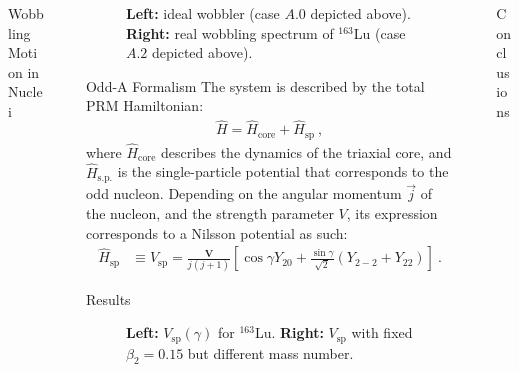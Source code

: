 \documentclass[final]{beamer}
\newlength{\sepwidth}
\newlength{\colwidth}
\newcommand{\separatorcolumn}{\begin{column}{\sepwidth}\end{column}}
\begin{document}
\begin{frame}[t]
\begin{columns}[t]
\begin{column}{\colwidth}
\begin{block}{Wobbling Motion in Nuclei}
\end{block}
\end{column}
\separatorcolumn
\begin{column}{\colwidth}
 \begin{figure}
\centering
\begin{minipage}{.5\textwidth}
  \centering
\end{minipage}%
\begin{minipage}{.5\textwidth}
  \centering
\end{minipage}
\caption{\textbf{Left:} ideal wobbler (case $A.0$ depicted above). \textbf{Right:} real wobbling spectrum of $^{163}$Lu (case $A.2$ depicted above).}
    \label{energy-function-min-point-evolution}
\end{figure}
  \begin{block}{Odd-A Formalism}
The system is described by the total PRM Hamiltonian:
\begin{align}
    \hat{H}=\hat{H}_\text{core}+\hat{H}_\text{sp}\ ,
\end{align}
where $\hat{H}_\text{core}$ describes the dynamics of the triaxial core, and $\hat{H}_\text{s.p.}$ is the single-particle potential that corresponds to the odd nucleon. Depending on the angular momentum $\vec{j}$ of the nucleon, and the strength parameter $V$, its expression corresponds to a Nilsson potential as such:
\begin{align}
\hat{H}_\text{sp}&\equiv V_\text{sp}=\frac{\mathbf{V}}{j(j+1)}\left[\cos\gamma Y_{20}+\frac{\sin\gamma}{\sqrt{2}}\left(Y_{2-2}+Y_{22}\right)\right]\ .
\end{align}
  \end{block}
    \begin{block}{Results}
  
   \begin{figure}
     \centering
     \begin{minipage}{.5\textwidth}
  \centering
\end{minipage}%
\begin{minipage}{.5\textwidth}
  \centering
\end{minipage}
     \caption{\textbf{Left:} $V_\text{sp}(\gamma)$ for $^{163}$Lu. \textbf{Right:} $V_\text{sp}$ with fixed $\beta_2=0.15$ but different mass number.}
     \label{vsp-behavior-gamma}
 \end{figure}
  \end{block}
\end{column}
\separatorcolumn
\begin{column}{\colwidth}
    \begin{block}{Conclusions}


\end{block}
\end{column}
\end{columns}
\end{frame}
\end{document}
